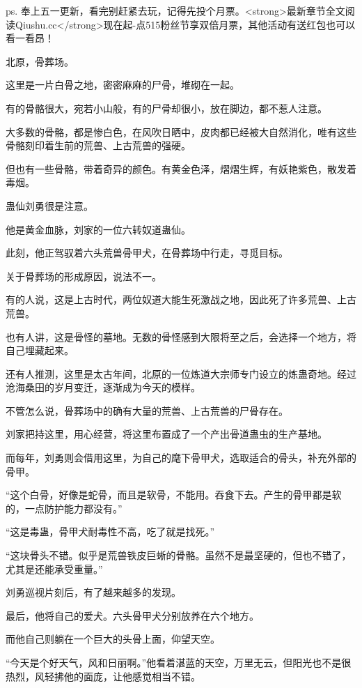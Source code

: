 
\begin{this_body}

ps. 奉上五一更新，看完别赶紧去玩，记得先投个月票。<strong>最新章节全文阅读Qiushu.cc</strong>现在起-点515粉丝节享双倍月票，其他活动有送红包也可以看一看昂！

北原，骨葬场。

这里是一片白骨之地，密密麻麻的尸骨，堆砌在一起。

有的骨骼很大，宛若小山般，有的尸骨却很小，放在脚边，都不惹人注意。

大多数的骨骼，都是惨白色，在风吹日晒中，皮肉都已经被大自然消化，唯有这些骨骼刻印着生前的荒兽、上古荒兽的强硬。

但也有一些骨骼，带着奇异的颜色。有黄金色泽，熠熠生辉，有妖艳紫色，散发着毒烟。

蛊仙刘勇很是注意。

他是黄金血脉，刘家的一位六转奴道蛊仙。

此刻，他正驾驭着六头荒兽骨甲犬，在骨葬场中行走，寻觅目标。

关于骨葬场的形成原因，说法不一。

有的人说，这是上古时代，两位奴道大能生死激战之地，因此死了许多荒兽、上古荒兽。

也有人讲，这是骨怪的墓地。无数的骨怪感到大限将至之后，会选择一个地方，将自己埋藏起来。

还有人推测，这里是太古年间，北原的一位炼道大宗师专门设立的炼蛊奇地。经过沧海桑田的岁月变迁，逐渐成为今天的模样。

不管怎么说，骨葬场中的确有大量的荒兽、上古荒兽的尸骨存在。

刘家把持这里，用心经营，将这里布置成了一个产出骨道蛊虫的生产基地。

而每年，刘勇则会借用这里，为自己的麾下骨甲犬，选取适合的骨头，补充外部的骨甲。

“这个白骨，好像是蛇骨，而且是软骨，不能用。吞食下去。产生的骨甲都是软的，一点防护能力都没有。”

“这是毒蛊，骨甲犬耐毒性不高，吃了就是找死。”

“这块骨头不错。似乎是荒兽铁皮巨蜥的骨骼。虽然不是最坚硬的，但也不错了，尤其是还能承受重量。”

刘勇巡视片刻后，有了越来越多的发现。

最后，他将自己的爱犬。六头骨甲犬分别放养在六个地方。

而他自己则躺在一个巨大的头骨上面，仰望天空。

“今天是个好天气，风和日丽啊。”他看着湛蓝的天空，万里无云，但阳光也不是很热烈，风轻拂他的面庞，让他感觉相当不错。


\end{this_body}
